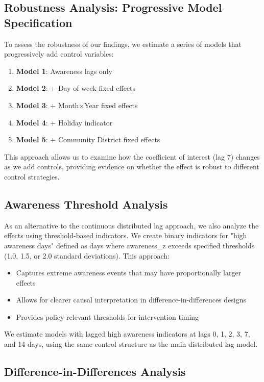 \documentclass[11pt,a4paper]{article}
\begin{document}
\subsection{Robustness Analysis: Progressive Model Specification}

To assess the robustness of our findings, we estimate a series of models that progressively add control variables:

\begin{enumerate}
    \item \textbf{Model 1}: Awareness lags only
    \item \textbf{Model 2}: + Day of week fixed effects
    \item \textbf{Model 3}: + Month×Year fixed effects
    \item \textbf{Model 4}: + Holiday indicator
    \item \textbf{Model 5}: + Community District fixed effects
\end{enumerate}

This approach allows us to examine how the coefficient of interest (lag 7) changes as we add controls, providing evidence on whether the effect is robust to different control strategies.

\subsection{Awareness Threshold Analysis}

As an alternative to the continuous distributed lag approach, we also analyze the effects using threshold-based indicators. We create binary indicators for "high awareness days" defined as days where awareness_z exceeds specified thresholds (1.0, 1.5, or 2.0 standard deviations). This approach:

\begin{itemize}
    \item Captures extreme awareness events that may have proportionally larger effects
    \item Allows for clearer causal interpretation in difference-in-differences designs
    \item Provides policy-relevant thresholds for intervention timing
\end{itemize}

We estimate models with lagged high awareness indicators at lags 0, 1, 2, 3, 7, and 14 days, using the same control structure as the main distributed lag model.

\subsection{Difference-in-Differences Analysis}
\end{document}
